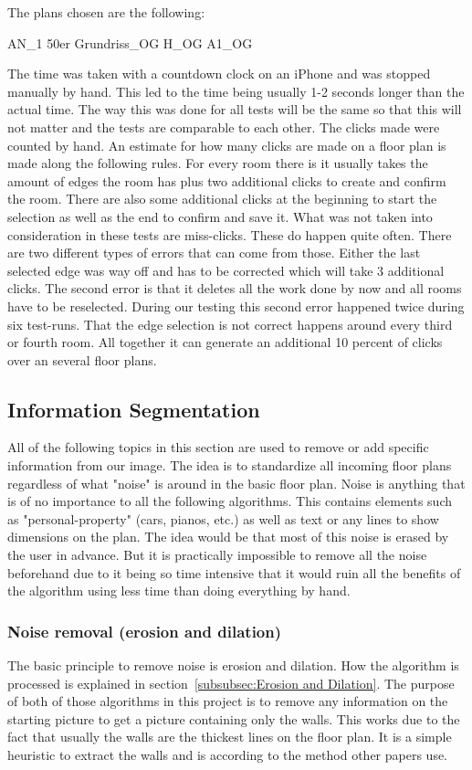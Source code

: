 The plans chosen are the following:

AN_1
50er
Grundriss_OG
H_OG
A1_OG

The time was taken with a countdown clock on an iPhone and was stopped manually by hand. This led to the time being usually 1-2 seconds longer than the actual time. The way this was done for all tests will be the same so that this will not matter and the tests are comparable to each other. The clicks made were counted by hand.
An estimate for how many clicks are made on a floor plan is made along the following rules. For every room there is it usually takes the amount of edges the room has plus two additional clicks to create and confirm the room. There are also some additional clicks at the beginning to start the selection as well as the end to confirm and save it.
What was not taken into consideration in these tests are miss-clicks. These do happen quite often. There are two different types of errors that can come from those. Either the last selected edge was way off and has to be corrected which will take 3 additional clicks. The second error is that it deletes all the work done by now and all rooms have to be reselected. During our testing this second error happened twice during six test-runs. That the edge selection is not correct happens around every third or fourth room. All together it can generate an additional 10 percent of clicks over an several floor plans.
\subsection{Information Segmentation}


All of the following topics in this section are used to remove or add specific information from our image. The idea is to standardize all incoming floor plans regardless of what "noise" is around in the basic floor plan. Noise is anything that is of no importance to all the following algorithms. This contains elements such as "personal-property" (cars, pianos, etc.) as well as text or any lines to show dimensions on the plan. The idea would be that most of this noise is erased by the user in advance. But it is practically impossible to remove all the noise beforehand due to it being so time intensive that it would ruin all the benefits of the algorithm using less time than doing everything by hand.


\subsubsection{Noise removal (erosion and dilation)}
The basic principle to remove noise is erosion and dilation. How the algorithm is processed is explained in section~\ref{subsubsec:Erosion and Dilation}.
The purpose of both of those algorithms in this project is to remove any information on the starting picture to get a picture containing only the walls. This works due to the fact that usually the walls are the thickest lines on the floor plan. It is a simple heuristic to extract the walls and is according to the method other papers use. 

